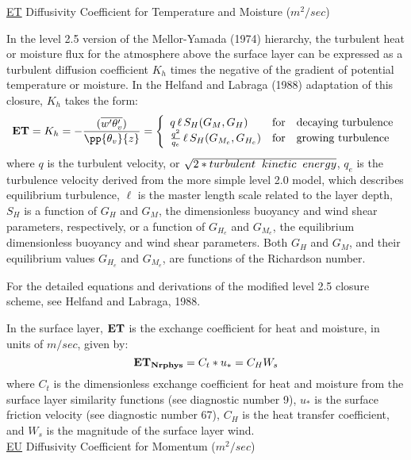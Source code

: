 \noindent
{ \underline {ET}  Diffusivity Coefficient for Temperature and Moisture ($m^2/sec$) }

\noindent
In the level 2.5 version of the Mellor-Yamada (1974) hierarchy, the turbulent heat or
moisture flux for the atmosphere above the surface layer can be expressed as a turbulent 
diffusion coefficient $K_h$ times the negative of the gradient of potential temperature 
or moisture. In the Helfand and Labraga (1988) adaptation of this closure, $K_h$ 
takes the form:
\[
{\bf ET} = K_h = -{( {\overline{w^{\prime}\theta_v^{\prime}}}) \over {\pp{\theta_v}{z}} }
 = \left\{ \begin{array}{l@{\quad\mbox{for}\quad}l} q \, \ell \, S_H(G_M,G_H) & \mbox{decaying turbulence}
\\ { q^2 \over {q_e} } \, \ell \, S_{H}(G_{M_e},G_{H_e}) & \mbox{growing turbulence} \end{array} \right.
\]
where $q$ is the turbulent velocity, or $\sqrt{2*turbulent \hspace{.2cm} kinetic \hspace{.2cm} 
energy}$, $q_e$ is the turbulence velocity derived from the more simple level 2.0 model, 
which describes equilibrium turbulence, $\ell$ is the master length scale related to the layer 
depth, 
$S_H$ is a function of $G_H$ and $G_M$, the dimensionless buoyancy and
wind shear parameters, respectively, or a function of $G_{H_e}$ and $G_{M_e}$, the equilibrium 
dimensionless buoyancy and wind shear
parameters.   Both $G_H$ and $G_M$, and their equilibrium values $G_{H_e}$ and $G_{M_e}$, 
are functions of the Richardson number.

\noindent
For the detailed equations and derivations of the modified level 2.5 closure scheme,
see Helfand and Labraga, 1988.

\noindent
In the surface layer, ${\bf {ET}}$ is the exchange coefficient for heat and moisture,
in units of $m/sec$, given by:
\[
{\bf ET_{Nrphys}} =  C_t * u_* = C_H W_s
\]
\noindent
where $C_t$ is the dimensionless exchange coefficient for heat and moisture from the 
surface layer similarity functions (see diagnostic number 9), $u_*$ is the surface 
friction velocity (see diagnostic number 67), $C_H$ is the heat transfer coefficient,
and $W_s$ is the magnitude of the surface layer wind.
\\
 
\noindent
{ \underline {EU}  Diffusivity Coefficient for Momentum ($m^2/sec$) }
 
